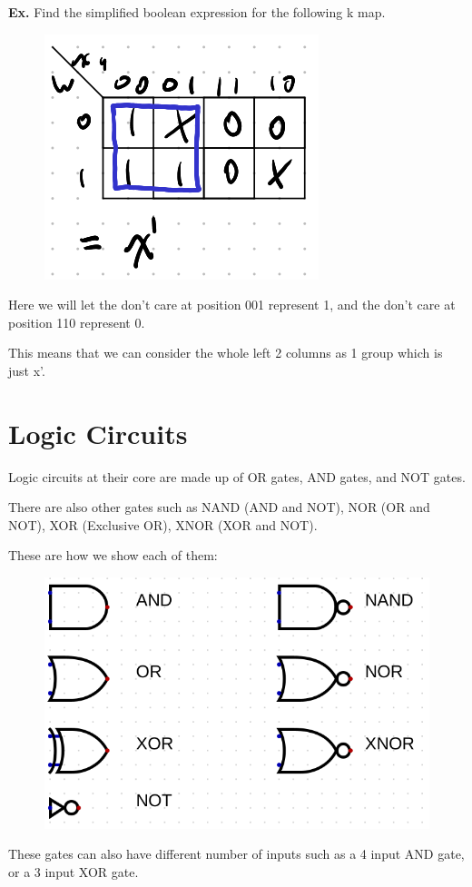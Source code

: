 \documentclass[12pt,letterpaper]{article} \usepackage{amsmath} \usepackage{graphicx}  \usepackage{longtable}  \usepackage{amssymb}
\begin{document}
        \begin{mdframed}
            \textbf{Ex. } Find the simplified boolean expression for the following k map.

            \begin{figure}[H]
                \centering
                \includegraphics[width=0.3\linewidth]{ex3.png}
            \end{figure}

            Here we will let the don't care at position 001 represent 1, and the don't care at position 110 represent 0. 

            This means that we can consider the whole left 2 columns as 1 group which is just x'.
        \end{mdframed}

    \section{Logic Circuits}
    Logic circuits at their core are made up of OR gates, AND gates, and NOT gates. 

    There are also other gates such as NAND (AND and NOT), NOR (OR and NOT), XOR (Exclusive OR), XNOR (XOR and NOT).

    These are how we show each of them:

    \begin{figure}[H]
        \centering
        \includegraphics[width=0.4\linewidth]{gates.png}
    \end{figure}

    These gates can also have different number of inputs such as a 4 input AND gate, or a 3 input XOR gate. 
\end{document}
